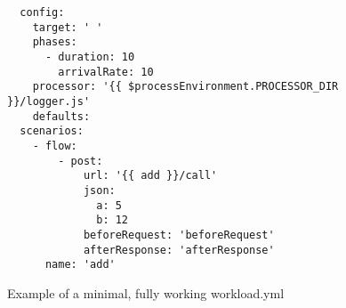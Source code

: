 \documentclass[../main.tex]{subfiles}
\begin{document}
\begin{figure}[H]
  \begin{tcolorbox}[titleDetachedStyle, title=\texttt{workload.yml}]
  \begin{verbatim}
  config:
    target: ' '
    phases:
      - duration: 10
        arrivalRate: 10
    processor: '{{ $processEnvironment.PROCESSOR_DIR }}/logger.js'
    defaults:
  scenarios:
    - flow:
        - post:
            url: '{{ add }}/call'
            json:
              a: 5
              b: 12
            beforeRequest: 'beforeRequest'
            afterResponse: 'afterResponse'
      name: 'add'
  \end{verbatim}
\end{tcolorbox}
\caption{Example of a minimal, fully working workload.yml}
\label{fig:exampleWorkloadYML}
\end{figure}
\end{document}
